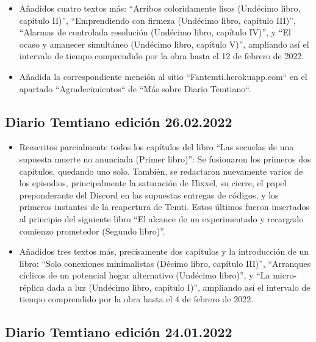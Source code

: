 \documentclass[
]{book}
\begin{document}
\begin{itemize}
\item
  Añadidos cuatro textos más: ``Arribos coloridamente lisos (Undécimo libro, capítulo II)'', ``Emprendiendo con firmeza (Undécimo libro, capítulo III)'', ``Alarmas de controlada resolución (Undécimo libro, capítulo IV)'', y ``El ocaso y amanecer simultáneo (Undécimo libro, capítulo V)'', ampliando así el intervalo de tiempo comprendido por la obra hasta el 12 de febrero de 2022.
\item
  Añadida la correspondiente mención al sitio ``Fantemti.herokuapp.com`` en el apartado ``Agradecimientos`` de ``Más sobre Diario Temtiano``.
\end{itemize}

\hypertarget{diario-temtiano-ediciuxf3n-26.02.2022}{%
\subsection*{Diario Temtiano edición 26.02.2022}\label{diario-temtiano-ediciuxf3n-26.02.2022}}

\begin{itemize}
\item
  Reescritos parcialmente todos los capítulos del libro ``Las secuelas de una supuesta muerte no anunciada (Primer libro)'': Se fusionaron los primeros dos capítulos, quedando uno solo. También, se redactaron nuevamente varios de los episodios, principalmente la saturación de Hixxel, su cierre, el papel preponderante del Discord en las supuestas entregas de códigos, y los primeros instantes de la reapertura de Temti. Estos últimos fueron insertados al principio del siguiente libro ``El alcance de un experimentado y recargado comienzo prometedor (Segundo libro)''.
\item
  Añadidos tres textos más, precisamente dos capítulos y la introducción de un libro: ``Solo conexiones minimalistas (Décimo libro, capítulo III)'', ``Arranques cíclicos de un potencial hogar alternativo (Undécimo libro)'', y ``La micro-réplica dada a luz (Undécimo libro, capítulo I)'', ampliando así el intervalo de tiempo comprendido por la obra hasta el 4 de febrero de 2022.
\end{itemize}

\hypertarget{diario-temtiano-ediciuxf3n-24.01.2022}{%
\subsection*{Diario Temtiano edición 24.01.2022}\label{diario-temtiano-ediciuxf3n-24.01.2022}}
\end{document}

